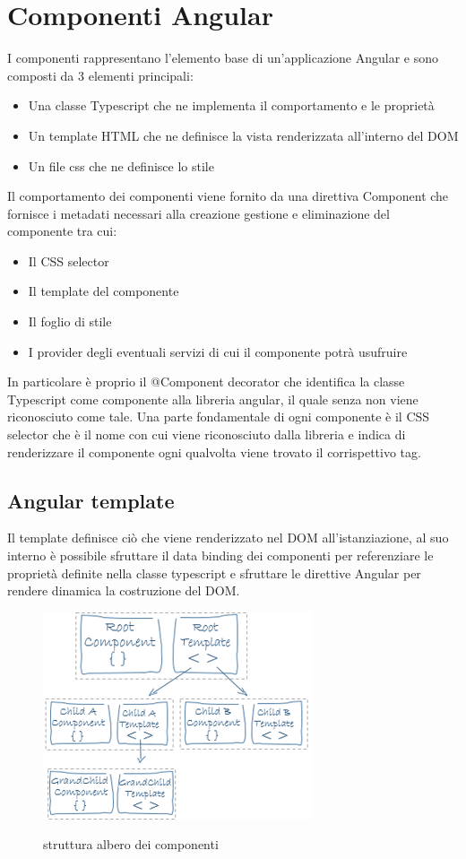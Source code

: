 \section{Componenti Angular}
I componenti rappresentano l'elemento base di un'applicazione Angular e sono composti da 3 elementi principali:
\begin{itemize}
    \item Una classe Typescript che ne implementa il comportamento e le proprietà
    \item Un template HTML che ne definisce la vista renderizzata all'interno del DOM
    \item Un file css che ne definisce lo stile
\end{itemize}
Il comportamento dei componenti viene fornito da una direttiva Component che fornisce i metadati necessari alla creazione gestione e eliminazione del componente tra cui:
\begin{itemize}
    \item Il CSS selector
    \item Il template del componente
    \item Il foglio di stile
    \item I provider degli eventuali servizi di cui il componente potrà usufruire
\end{itemize}
In particolare è proprio il @Component decorator che identifica la classe Typescript come componente alla libreria angular, il quale senza non viene riconosciuto come tale.
\newline
Una parte fondamentale di ogni componente è il CSS selector che è il nome con cui viene riconosciuto dalla libreria e indica di renderizzare il componente ogni qualvolta viene trovato il corrispettivo tag.
\newline
\subsection{Angular template}
Il template definisce ciò che viene renderizzato nel DOM all'istanziazione,
al suo interno è possibile sfruttare il data binding dei componenti  per referenziare le proprietà definite nella classe typescript e sfruttare le direttive Angular per rendere dinamica la costruzione del DOM.
\newline
\newline
\begin{figure}[H]
    \centering
    \includegraphics[scale=1]{resources/component-tree.png}
    \cite{angular-doc}
    \caption{struttura albero dei componenti}
\end{figure}

